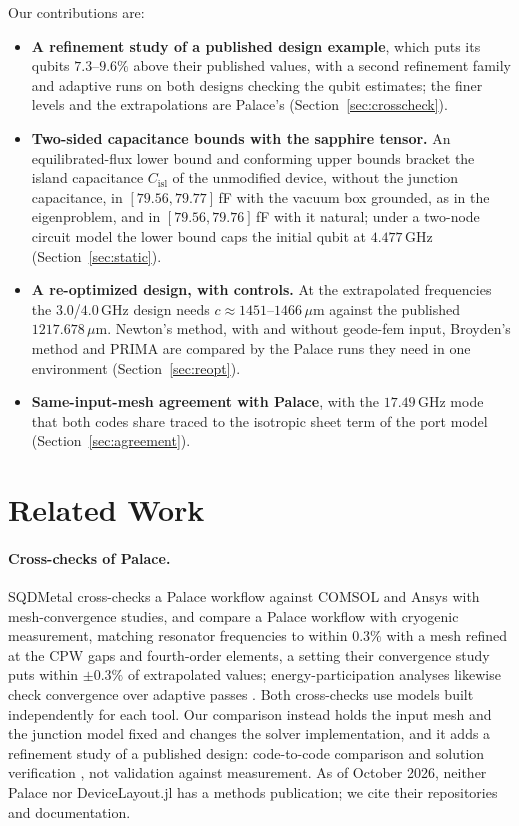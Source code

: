 \documentclass{anvil-paper}
\newcommand{\Cisl}{C_{\mathrm{isl}}}
\begin{document}
Our contributions are:
\begin{itemize}
  \item \textbf{A refinement study of a published design example}, which
    puts its qubits $7.3$--$9.6\%$ above their published values, with a
    second refinement family and adaptive runs on both designs checking
    the qubit estimates; the finer levels and the extrapolations are
    Palace's (Section~\ref{sec:crosscheck}).
  \item \textbf{Two-sided capacitance bounds with the sapphire tensor.}
    An equilibrated-flux lower bound and conforming upper bounds bracket
    the island capacitance $\Cisl$ of the unmodified device, without the
    junction capacitance, in $[79.56, 79.77]$\,fF with the vacuum box
    grounded, as in the eigenproblem, and in $[79.56, 79.76]$\,fF with it
    natural; under a two-node circuit model the lower bound caps the
    initial qubit at $4.477$\,GHz (Section~\ref{sec:static}).
  \item \textbf{A re-optimized design, with controls.} At the extrapolated
    frequencies the $3.0$/$4.0$\,GHz design needs $c \approx
    1451$--$1466\,\mu$m against the published $1217.678\,\mu$m. Newton's
    method, with and without geode-fem input, Broyden's method and PRIMA
    are compared by the Palace runs they need in one environment
    (Section~\ref{sec:reopt}).
  \item \textbf{Same-input-mesh agreement with Palace}, with the
    $17.49$\,GHz mode that both codes share traced to the isotropic sheet
    term of the port model (Section~\ref{sec:agreement}).
\end{itemize}

\section{Related Work}
\label{sec:related}

\paragraph{Cross-checks of Palace.}
SQDMetal \citep{sommers2025open} cross-checks a Palace workflow against
COMSOL and Ansys with mesh-convergence studies, and
\citet{ye2025electromagnetic} compare a Palace workflow with cryogenic
measurement, matching resonator frequencies to within $0.3\%$ with a mesh
refined at the CPW gaps and fourth-order elements, a setting their
convergence study puts within $\pm0.3\%$ of extrapolated values;
energy-participation analyses likewise check convergence over adaptive
passes \citep{minev2021energy}. Both cross-checks use models built
independently for each tool. Our comparison instead holds the input mesh
and the junction model fixed and changes the solver implementation, and it
adds a refinement study of a published design: code-to-code comparison and
solution verification \citep{oberkampf2010verification}, not validation
against measurement. As of October 2026, neither Palace nor DeviceLayout.jl has a
methods publication; we cite their repositories and documentation.
\end{document}
